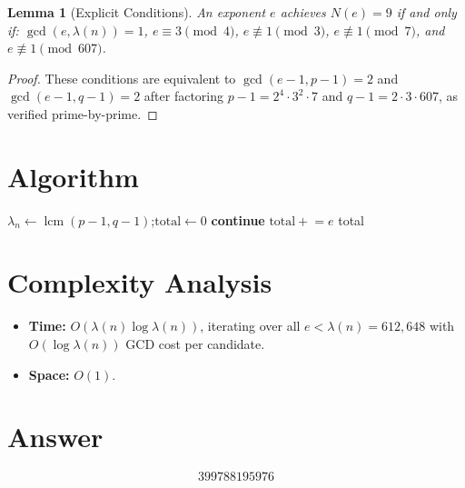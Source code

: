 \documentclass[12pt]{article}
\newtheorem{lemma}[theorem]{Lemma}
\begin{document}
\begin{lemma}[Explicit Conditions]
An exponent $e$ achieves $N(e) = 9$ if and only if: $\gcd(e, \lambda(n)) = 1$, $e \equiv 3 \pmod{4}$, $e \not\equiv 1 \pmod{3}$, $e \not\equiv 1 \pmod{7}$, and $e \not\equiv 1 \pmod{607}$.
\end{lemma}

\begin{proof}
These conditions are equivalent to $\gcd(e-1, p-1) = 2$ and $\gcd(e-1, q-1) = 2$ after factoring $p - 1 = 2^4 \cdot 3^2 \cdot 7$ and $q - 1 = 2 \cdot 3 \cdot 607$, as verified prime-by-prime.
\end{proof}

\section{Algorithm}

\begin{algorithmic}[1]
    \State $\lambda_n \gets \operatorname{lcm}(p-1, q-1)$;\quad $\mathrm{total} \gets 0$
         \textbf{continue} \EndIf
            \State $\mathrm{total} \mathrel{+}= e$
        \EndIf
    \EndFor
    \State \Return total
\EndFunction
\end{algorithmic}

\section{Complexity Analysis}

\begin{itemize}
    \item \textbf{Time:} $O(\lambda(n) \log \lambda(n))$, iterating over all $e < \lambda(n) = 612{,}648$ with $O(\log \lambda(n))$ GCD cost per candidate.
    \item \textbf{Space:} $O(1)$.
\end{itemize}

\section{Answer}

\[
\boxed{399788195976}
\]
\end{document}
